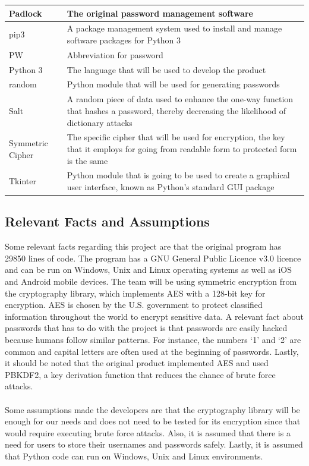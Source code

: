 \documentclass[12pt, titlepage]{article}
\begin{document}
\begin{table}
\begin{center}
\begin{tabular}{ | p{3cm} | p{10cm} | }
	\hline
	Padlock & The original password management software \\
	\hline
	pip3 & A package management system used to install and manage software packages for Python 3 \\
	\hline
	PW & Abbreviation for password \\
	\hline
	Python 3 & The language that will be used to develop the product\\
	\hline
	random & Python module that will be used for generating passwords \\
	\hline
	Salt & A random piece of data used to enhance the one-way function that hashes a password, thereby decreasing the likelihood of dictionary attacks \\
	\hline
	Symmetric Cipher & The specific cipher that will be used for encryption, the key that it employs for going from readable form to protected form is the same \\
	\hline
	Tkinter & Python module that is going to be used to create a graphical user interface, known as Python’s standard GUI package \\
\hline
\end{tabular}
\end{center}
\end{table}

\subsection{Relevant Facts and Assumptions}

Some relevant facts regarding this project are that the original program has 29850 lines of code. 
The program has a GNU General Public Licence v3.0 licence and can be run on Windows, Unix and Linux 
operating systems as well as iOS and Android mobile devices. The team will be using symmetric encryption
 from the cryptography library, which implements AES with a 128-bit key for encryption. AES is chosen by the 
U.S. government to protect classified information throughout the world to encrypt sensitive data. A relevant 
fact about passwords that has to do with the project is that passwords are easily hacked because humans 
follow similar patterns. For instance, the numbers ‘1’ and ‘2’ are common and capital letters are often used at
 the beginning of passwords. Lastly, it should be noted that the original product implemented AES and used 
PBKDF2, a key derivation function that reduces the chance of brute force attacks.
\\
\\
Some assumptions made the developers are that the cryptography library will be enough for our needs and does
 not need to be tested for its encryption since that would require executing brute force attacks. Also, it is 
assumed that there is a need for users to store their usernames and passwords safely. Lastly, it is assumed 
that Python code can run on Windows, Unix and Linux environments. 
\end{document}
